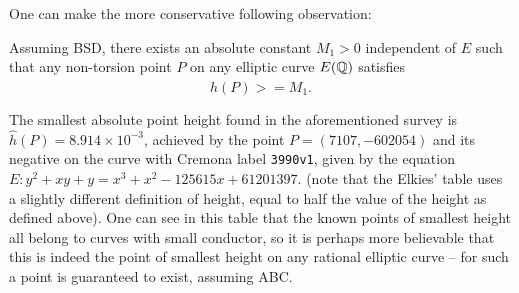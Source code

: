 One can make the more conservative following observation:
\begin{corollary}\label{conj:point_height_lower_bound}
Assuming BSD, there exists an absolute constant $M_1 >0$ independent of $E$ such that any non-torsion point $P$ on any elliptic curve $E(\mathbb{Q})$ satisfies
\begin{equation}
\hat{h}(P) >= M_1 .
\end{equation}
\end{corollary}
The smallest absolute point height found in the aforementioned survey is $\hat{h}(P) = 8.914\times 10^{-3}$, achieved by the point $P = (7107,-602054)$ and its negative on the curve with Cremona label {\tt 3990v1}, given by the equation $E: y^2+xy+y=x^3+x^2-125615x+61201397$. (note that the Elkies' table uses a slightly different definition of height, equal to half the value of the height as defined above). One can see in this table that the known points of smallest height all belong to curves with small conductor, so it is perhaps more believable that this is indeed the point of smallest height on any rational elliptic curve -- for such a point is guaranteed to exist, assuming ABC. \\


